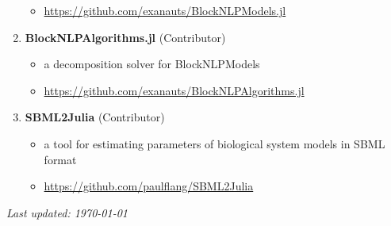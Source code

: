 \message{ !name(shin-abet.tex)}\documentclass[letterpaper, 11pt]{article}
\begin{document}
\begin{enumerate}[itemsep=0pt]
\begin{itemize}[leftmargin=*,topsep=0pt,label=$\bullet$,topsep=-5pt,itemsep=-1pt]
  \item \url{https://github.com/exanauts/BlockNLPModels.jl}
  \end{itemize}
\item \textbf{BlockNLPAlgorithms.jl} (Contributor)
  \begin{itemize}[leftmargin=*,topsep=0pt,label=$\bullet$,topsep=-5pt,itemsep=-1pt]
  \item a decomposition solver for BlockNLPModels
  \item \url{https://github.com/exanauts/BlockNLPAlgorithms.jl}
  \end{itemize}
\item \textbf{SBML2Julia} (Contributor)
  \begin{itemize}[leftmargin=*,topsep=0pt,label=$\bullet$,topsep=-5pt,itemsep=-1pt]
  \item a tool for estimating parameters of biological system models in SBML format
  \item \url{https://github.com/paulflang/SBML2Julia}
  \end{itemize}
\end{enumerate}


{\noindent\it Last updated: \today}
\end{document}
